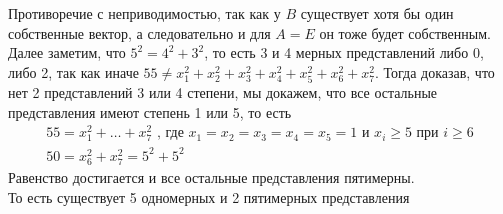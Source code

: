 	Противоречие с неприводимостью, так как у $B$ существует хотя бы один собственные вектор, а следовательно и для $A = E$ он тоже будет собственным.\\
	Далее заметим, что $5^2 = 4^2 + 3^2$, то есть 3 и 4 мерных представлений либо 0, либо 2, так как иначе $55 \ne x_1^2 + x_2^2 + x_3^2 + x_4^2 + x_5^2 + x_6^2 + x_7^2$. Тогда доказав, что нет 2 представлений 3 или 4 степени, мы докажем, что все остальные представления имеют степень 1 или 5, то есть
	\begin{gather*}
		55 = x_1^2 + \ldots + x_7^{2} \text{ , где } x_1 = x_2 = x_3 = x_4 = x_5 = 1 \text{ и } x_i \geqslant 5 \text{ при } i \geqslant 6\\
		50 = x_6^2 + x_7^2 = 5^2 + 5^2
	\end{gather*}
	Равенство достигается и все остальные представления пятимерны.\\
	То есть существует 5 одномерных и 2 пятимерных представления
	
\newpage
